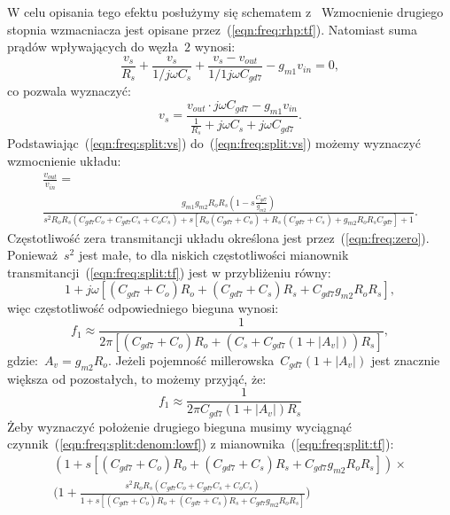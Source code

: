 \documentclass[twoside,pl,final]{labman}
\begin{document}
W celu opisania tego efektu posłużymy się
schematem z~
Wzmocnienie drugiego stopnia wzmacniacza jest opisane
przez~(\ref{eqn:freq:rhp:tf}).
Natomiast suma prądów wpływających do węzła~$2$ wynosi:
\begin{equation}
  \frac{v_s}{R_s} +
  \frac{v_s}{1 / j \omega C_s} +
  \frac{v_s - v_{out}}{1 / 1 j \omega C_{gd7}} -
  g_{m1} v_{in} = 0,
  \label{eqn:freq:split:kirchoff}
\end{equation}
co pozwala wyznaczyć:
\begin{equation}
  v_s = \frac{v_{out} \cdot j \omega C_{gd7} - g_{m1} v_{in}}
        {\frac{1}{R_s} + j \omega C_s + j \omega C_{gd7}}.
  \label{eqn:freq:split:vs}
\end{equation}
Podstawiając~(\ref{eqn:freq:split:vs}) do~(\ref{eqn:freq:split:vs})
możemy wyznaczyć wzmocnienie układu:
\begin{align}
  \frac{v_{out}}{v_{in}} = \nonumber \\
  \frac{g_{m1} g_{m2} R_o R_s (1 - s \frac{C_{gd7}}{g_{m2}})}
    {s^2 R_o R_s (C_{gd7} C_o + C_{gd7} C_s + C_o C_s) +
    s[R_o (C_{gd7} + C_o) + R_s (C_{gd7} + C_s) + g_{m2} R_o R_s C_{gd7}] + 1}.
  \label{eqn:freq:split:tf}
\end{align}
Częstotliwość zera transmitancji układu
określona jest przez~(\ref{eqn:freq:zero}).
Ponieważ~$s^2$ jest małe,
to dla niskich częstotliwości mianownik
transmitancji~(\ref{eqn:freq:split:tf})
jest w przybliżeniu równy:
\begin{equation}
  1 + j \omega [(C_{gd7} + C_o) R_o +
                (C_{gd7} + C_s) R_s +
                C_{gd7} g_{m2} R_o R_s],
  \label{eqn:freq:split:denom:lowf}
\end{equation}
więc częstotliwość odpowiedniego bieguna wynosi:
\begin{equation}
  f_1 \approx \frac{1}{2 \pi [(C_{gd7} + C_o) R_o +
                              (C_s + C_{gd7} (1 + |A_v|)) R_s]},
  \label{eqn:freq:split:pole:low}
\end{equation}
gdzie:~$A_v = g_{m2} R_o$.
Jeżeli pojemność millerowska~$C_{gd7} (1 + |A_v|)$ jest
znacznie większa od pozostałych, to możemy przyjąć, że:
\begin{equation}
  f_1 \approx \frac{1}{2 \pi C_{gd7} (1 + |A_v|) R_s}
  \label{eqn:freq:split:pole:low:approx}
\end{equation}
Żeby wyznaczyć położenie drugiego bieguna musimy
wyciągnąć czynnik~(\ref{eqn:freq:split:denom:lowf})
z mianownika~(\ref{eqn:freq:split:tf}):
\begin{align}
  (1 + s[(C_{gd7} + C_o) R_o +
         (C_{gd7} + C_s) R_s +
          C_{gd7} g_{m2} R_o R_s]) \times \nonumber \\
  \Big(1 + \frac{s^2 R_o R_s (C_{gd7} C_o + C_{gd7} C_s + C_o C_s)}
                {1 + s[(C_{gd7} + C_o) R_o +
                       (C_{gd7} + C_s) R_s +
                        C_{gd7} g_{m2} R_o R_s]}\Big)
\end{align}
\end{document}
